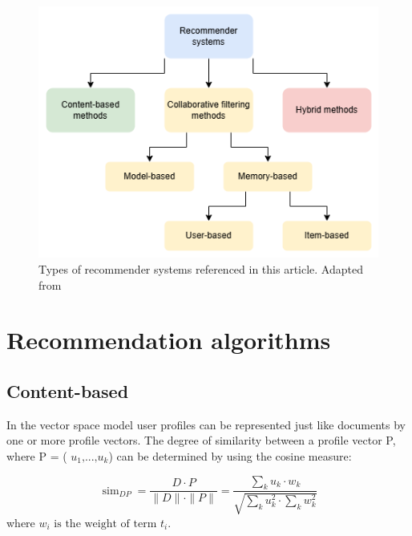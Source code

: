 \documentclass[10pt,twoside,english,a4paper]{article}
\begin{document}
\begin{figure}[H]
	\includegraphics[width=1\textwidth]{./diagrams/recommender_systems_types.png}
	\caption{Types of recommender systems referenced in this article. Adapted from \cite{10113923}}
	\label{fig:fig2}
\end{figure}






\section{Recommendation algorithms}

\subsection{Content-based}

In the vector space model user profiles can be represented just like documents by one 
or more profile vectors. The degree of similarity between a profile vector P, where 
P = ( \( u_1 \text{,...,} u_k \)) can be determined by using the cosine measure:\cite{LU228322}

\begin{equation*}\mathop{\text{sim}}\nolimits_{DP} = \frac{D \cdot P}{\|D\| \cdot \|P\|} = \frac{\sum\limits_k u_k \cdot w_k}{\sqrt{\sum\limits_k u_k^2 \cdot \sum\limits_k w_k^2}} \tag{4}\end{equation*}
where \( w_i \text{ is the weight of term } t_i \).
\end{document}
